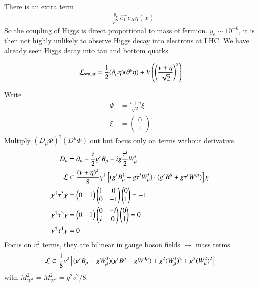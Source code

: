 There is an extra term
\begin{align*}
   - \frac{y_e}{\sqrt{2}} \overline{e}_L^- e_R \eta(x)
\end{align*}
So the coupling of Higgs is direct proportional to mass of fermion. $y_e \sim 10^{-6}$, it is then not highly unlikely to observe Higgs decay into electrons at LHC. We have already seen Higgs decay into tau and bottom quarks.

\begin{align}
   \mathcal{L}_\text{scalar} = \frac{1}{2} (\partial_\mu \eta) (\partial^\mu \eta) + V \left(\left(\frac{v+\eta}{\sqrt{2}}\right)^2 \right)
\end{align} 

Write 
\begin{align*}
   \Phi &= \frac{v + \eta}{\sqrt{2}} \xi \\ 
   \xi &= \begin{pmatrix} 0 \\ 1\end{pmatrix}
\end{align*}
Multiply $(D_\mu \Phi)^\dagger (D^\mu \Phi)$ out but focus only on terms without derivative
\begin{align*}
   D_\mu &= \partial_\mu - \frac{i}{2} g' B_\mu - ig \frac{\tau^i}{2} W_\mu^i \\
   \mathcal{L}  &\subset \frac{(v+\eta)^2}{8} \chi^\dagger \left[ (g'B_\mu^\dagger + g \tau^i W^i _\mu) \cdot (g' B^\mu + g \tau^i W^{i \mu})\right] \chi \\
   \chi^\dagger \tau^3 \chi &= \begin{pmatrix} 0 & 1\end{pmatrix} \begin{pmatrix} 1 & 0 \\ 0 & -1 \end{pmatrix} \begin{pmatrix} 0 \\ 1\end{pmatrix} = -1 \\
   \chi^\dagger \tau^2 \chi &= \begin{pmatrix} 0 & 1\end{pmatrix} \begin{pmatrix} 0 & -i \\ i & 0 \end{pmatrix} \begin{pmatrix} 0 \\ 1 \end{pmatrix} = 0 \\
   \chi^\dagger \tau^1 \chi &= 0\\
\end{align*}
Focus on $v^2$ terms, they are bilinear in gauge boson fields $\rightarrow$ mass terms.
\begin{align}
   \mathcal{L} \subset \frac{1}{8} v^2 \left[ (g'B_\mu - g W^3_\mu) (g' B^\mu-gW^{3 \mu}) + g^2 (W_\mu^1)^2 + g^2 (W_\mu^2)^2 \right]
\end{align}
with $M^2_{W^1} = M^2_{W^2} = {g^2 v^2}/ {8}$.

